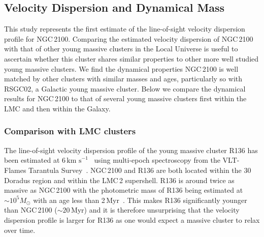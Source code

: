 \documentclass[useAMS,usenatbib]{mn2e}
\def\kms{$\mbox{km s}^{-1}$}
\begin{document}
\subsection{Velocity Dispersion and Dynamical Mass} %
\label{sub:velocity_dispersion_Mdyn}


This study represents the first estimate of the line-of-sight velocity dispersion profile for NGC\,2100.
Comparing the estimated velocity dispersion of NGC\,2100 with that of other young massive clusters in the Local Universe is useful to ascertain whether this cluster shares similar properties to other more well studied young massive clusters.
We find the dynamical properties NGC\,2100 is well matched by other clusters with similar masses and ages, particularly so with RSGC02, a Galactic young massive cluster.
Below we compare the dynamical results for NGC\,2100 to that of several young massive clusters first within the LMC and then within the Galaxy.

\subsubsection{Comparison with LMC clusters} %
\label{sub:comparison_with_lmc_clusters}


The line-of-sight velocity dispersion profile of the young massive cluster R136 has been estimated at 6\,\kms~\citep{2012A&A...546A..73H} using multi-epoch spectroscopy from the VLT-Flames Tarantula Survey~\citep{2011A&A...530A.108E}.
NGC\,2100 and R136 are both located within the 30 Doradus region and within the LMC\,2 supershell.
R136 is around twice as massive as NGC\,2100 with the photometric mass of R136 being estimated at $\sim10^{5}M_{\odot}$ with an age less than 2\,Myr~\citep{1998ApJ...509..879D,1998ApJ...493..180M,2010MNRAS.408..731C}.
This makes R136 significantly younger than NGC\,2100 ($\sim20$\,Myr) and it is therefore unsurprising that the velocity dispersion profile is larger for R136 as one would expect a massive cluster to relax over time.
\end{document}
